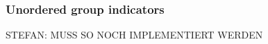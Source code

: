 \begin{itemize}
%
%
%
%
%
%
%
%
\end{itemize}


\subsubsection*{Unordered group indicators}

STEFAN: MUSS SO NOCH IMPLEMENTIERT WERDEN

